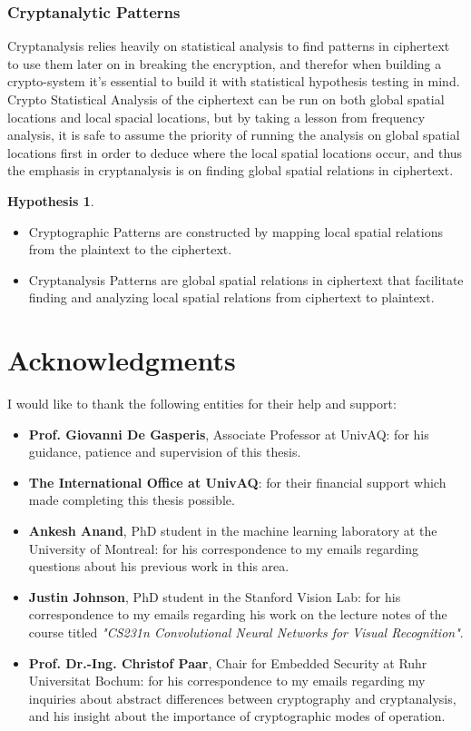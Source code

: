 \documentclass[a4paper, 12pt]{report}
\newtheorem{hypothesis}{Hypothesis}
\begin{document}
\subsection*{\textbf{Cryptanalytic Patterns}}
Cryptanalysis relies heavily on statistical analysis to find patterns in ciphertext to use them later on in breaking the encryption, and therefor when building a crypto-system it's essential to build it with statistical hypothesis testing in mind.\citep{7031850}\\
Crypto Statistical Analysis of the ciphertext can be run on both global spatial locations and local spacial locations, but by taking a lesson from frequency analysis, it is safe to assume the priority of running the analysis on global spatial locations first in order to deduce where the local spatial locations occur, and thus the emphasis in cryptanalysis is on finding global spatial relations in ciphertext.\\
\begin{hypothesis}\end{hypothesis}
	\begin{itemize}[nosep]
		\item Cryptographic Patterns are constructed by mapping local spatial relations from the plaintext to the ciphertext.
		\item Cryptanalysis Patterns are global spatial relations in ciphertext that facilitate finding and analyzing local spatial relations from ciphertext to plaintext. 
	\end{itemize}
\newpage
\chapter*{Acknowledgments}
I would like to thank the following entities for their help and support:
\begin{itemize}
	\item \textbf{Prof. Giovanni De Gasperis}, Associate Professor at UnivAQ: for his guidance, patience and supervision of this thesis.
	\item \textbf{The International Office at UnivAQ}: for their financial support which made completing this thesis possible.
	\item \textbf{Ankesh Anand}, PhD student in the machine learning laboratory at the University of Montreal: for his correspondence to my emails regarding questions about his previous work in this area\citep{ankeshanand/neural-cryptography-tensorflow}.
	\item \textbf{Justin Johnson}, PhD student in the Stanford Vision Lab: for his correspondence to my emails regarding his work on the lecture notes of the course titled \textit{"CS231n Convolutional Neural Networks for Visual Recognition"}\citep{cs231n}.
	\item \textbf{Prof. Dr.-Ing. Christof Paar}, Chair for Embedded Security at Ruhr Universitat Bochum: for his correspondence to my emails regarding my inquiries about abstract differences between cryptography and cryptanalysis, and his insight about the importance of cryptographic modes of operation.
\end{itemize}
\newpage
\medskip


\end{document}
